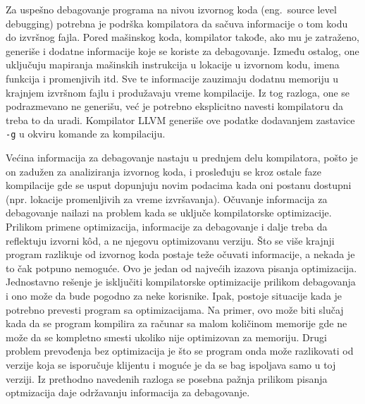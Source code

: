 \documentclass[12pt,oneside]{memoir}
\begin{document}
Za uspešno debagovanje programa na nivou izvornog koda (eng.~{source level debugging}) potrebna je podrška kompilatora da sačuva informacije o tom kodu do izvršnog fajla.
Pored mašinskog koda, kompilator takođe, ako mu je zatraženo, generiše i dodatne informacije koje se koriste za debagovanje.
Između ostalog, one uključuju mapiranja mašinskih instrukcija u lokacije u izvornom kodu, imena funkcija i promenjivih itd.
Sve te informacije zauzimaju dodatnu memoriju u krajnjem izvršnom fajlu i produžavaju vreme kompilacije.
Iz tog razloga, one se podrazmevano ne generišu, već je potrebno eksplicitno navesti kompilatoru da treba to da uradi.
Kompilator LLVM generiše ove podatke dodavanjem zastavice \verb|-g| u okviru komande za kompilaciju.

Većina informacija za debagovanje nastaju u prednjem delu kompilatora, pošto je on zadužen za analiziranja izvornog koda, i prosleđuju se kroz ostale faze kompilacije gde se usput dopunjuju novim podacima kada oni postanu dostupni (npr. lokacije promenljivih za vreme izvršavanja). %
Očuvanje informacija za debagovanje nailazi na problem kada se uključe kompilatorske optimizacije.
Prilikom primene optimizacija, informacije za debagovanje i dalje treba da reflektuju izvorni k\^od, a ne njegovu optimizovanu verziju.
Što se više krajnji program razlikuje od izvornog koda postaje teže očuvati informacije, a nekada je to čak potpuno nemoguće.
Ovo je jedan od najvećih izazova pisanja optimizacija.
Jednostavno rešenje je isključiti kompilatorske optimizacije prilikom debagovanja i ono može da bude pogodno za neke korisnike.
Ipak, postoje situacije kada je potrebno prevesti program sa optimizacijama.
Na primer, ovo može biti slučaj kada da se program kompilira za računar sa malom količinom memorije gde ne može da se kompletno smesti ukoliko nije optimizovan za memoriju.
Drugi problem prevođenja bez optimizacija je što se program onda može razlikovati od verzije koja se isporučuje klijentu i moguće je da se bag ispoljava samo u toj verziji.
Iz prethodno navedenih razloga se posebna pažnja prilikom pisanja optmizacija daje održavanju informacija za debagovanje.
\end{document}
